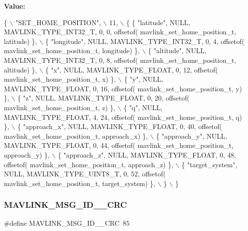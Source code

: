 {\bfseries Value\+:}
\begin{DoxyCode}
\{ \(\backslash\)
    \textcolor{stringliteral}{"SET\_HOME\_POSITION"}, \(\backslash\)
    11, \(\backslash\)
    \{  \{ \textcolor{stringliteral}{"latitude"}, NULL, MAVLINK_TYPE_INT32_T, 0, 0, offsetof(
      mavlink_set_home_position_t, latitude) \}, \(\backslash\)
         \{ \textcolor{stringliteral}{"longitude"}, NULL, MAVLINK_TYPE_INT32_T, 0, 4, offsetof(
      mavlink_set_home_position_t, longitude) \}, \(\backslash\)
         \{ \textcolor{stringliteral}{"altitude"}, NULL, MAVLINK_TYPE_INT32_T, 0, 8, offsetof(
      mavlink_set_home_position_t, altitude) \}, \(\backslash\)
         \{ \textcolor{stringliteral}{"x"}, NULL, MAVLINK_TYPE_FLOAT, 0, 12, offsetof(
      mavlink_set_home_position_t, x) \}, \(\backslash\)
         \{ \textcolor{stringliteral}{"y"}, NULL, MAVLINK_TYPE_FLOAT, 0, 16, offsetof(
      mavlink_set_home_position_t, y) \}, \(\backslash\)
         \{ \textcolor{stringliteral}{"z"}, NULL, MAVLINK_TYPE_FLOAT, 0, 20, offsetof(
      mavlink_set_home_position_t, z) \}, \(\backslash\)
         \{ \textcolor{stringliteral}{"q"}, NULL, MAVLINK_TYPE_FLOAT, 4, 24, offsetof(
      mavlink_set_home_position_t, q) \}, \(\backslash\)
         \{ \textcolor{stringliteral}{"approach\_x"}, NULL, MAVLINK_TYPE_FLOAT, 0, 40, offsetof(
      mavlink_set_home_position_t, approach\_x) \}, \(\backslash\)
         \{ \textcolor{stringliteral}{"approach\_y"}, NULL, MAVLINK_TYPE_FLOAT, 0, 44, offsetof(
      mavlink_set_home_position_t, approach\_y) \}, \(\backslash\)
         \{ \textcolor{stringliteral}{"approach\_z"}, NULL, MAVLINK_TYPE_FLOAT, 0, 48, offsetof(
      mavlink_set_home_position_t, approach\_z) \}, \(\backslash\)
         \{ \textcolor{stringliteral}{"target\_system"}, NULL, MAVLINK_TYPE_UINT8_T, 0, 52, offsetof(
      mavlink_set_home_position_t, target\_system) \}, \(\backslash\)
         \} \(\backslash\)
\}
\end{DoxyCode}
\mbox{\label{mavlink__msg__set__home__position_8h_aa7342725064b4eb627ce223c28de8624}} 
\subsubsection{M\+A\+V\+L\+I\+N\+K\+\_\+\+M\+S\+G\+\_\+\+I\+D\+\_\+\_\+\+C\+RC}
{\footnotesize\ttfamily \#define M\+A\+V\+L\+I\+N\+K\+\_\+\+M\+S\+G\+\_\+\+I\+D\+\_\+\_\+\+C\+RC~85}

